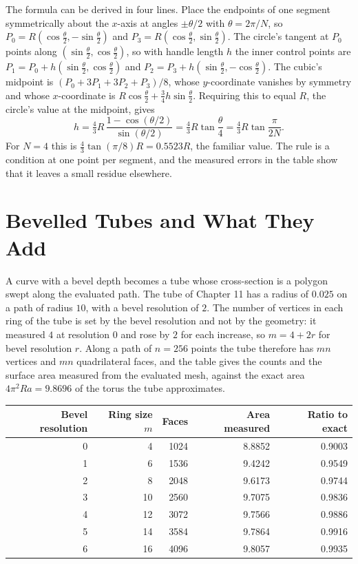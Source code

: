The formula can be derived in four lines. Place the endpoints of one segment symmetrically about the $x$-axis at angles $\pm\theta/2$ with $\theta=2\pi/N$, so $P_0=R(\cos\tfrac\theta2,-\sin\tfrac\theta2)$ and $P_3=R(\cos\tfrac\theta2,\sin\tfrac\theta2)$. The circle's tangent at $P_0$ points along $(\sin\tfrac\theta2,\cos\tfrac\theta2)$, so with handle length $h$ the inner control points are $P_1=P_0+h(\sin\tfrac\theta2,\cos\tfrac\theta2)$ and $P_2=P_3+h(\sin\tfrac\theta2,-\cos\tfrac\theta2)$. The cubic's midpoint is $(P_0+3P_1+3P_2+P_3)/8$, whose $y$-coordinate vanishes by symmetry and whose $x$-coordinate is $R\cos\tfrac\theta2+\tfrac34h\sin\tfrac\theta2$. Requiring this to equal $R$, the circle's value at the midpoint, gives
\[
  h=\tfrac43R\,\frac{1-\cos(\theta/2)}{\sin(\theta/2)}=\tfrac43R\tan\frac\theta4=\tfrac43R\tan\frac{\pi}{2N}.
\]
For $N=4$ this is $\tfrac43\tan(\pi/8)R=0.5523R$, the familiar value. The rule is a condition at one point per segment, and the measured errors in the table show that it leaves a small residue elsewhere.

\section{Bevelled Tubes and What They Add}

A curve with a bevel depth becomes a tube whose cross-section is a polygon swept along the evaluated path. The tube of Chapter 11 has a radius of $0.025$ on a path of radius $10$, with a bevel resolution of $2$. The number of vertices in each ring of the tube is set by the bevel resolution and not by the geometry: it measured $4$ at resolution $0$ and rose by $2$ for each increase, so $m=4+2r$ for bevel resolution $r$. Along a path of $n=256$ points the tube therefore has $mn$ vertices and $mn$ quadrilateral faces, and the table gives the counts and the surface area measured from the evaluated mesh, against the exact area $4\pi^2Ra=9.8696$ of the torus the tube approximates.

\begin{center}
\begin{tabular}{rrrrr}
\toprule
Bevel resolution & Ring size $m$ & Faces & Area measured & Ratio to exact\\
\midrule
0 & 4 & 1024 & 8.8852 & 0.9003\\
1 & 6 & 1536 & 9.4242 & 0.9549\\
2 & 8 & 2048 & 9.6173 & 0.9744\\
3 & 10 & 2560 & 9.7075 & 0.9836\\
4 & 12 & 3072 & 9.7566 & 0.9886\\
5 & 14 & 3584 & 9.7864 & 0.9916\\
6 & 16 & 4096 & 9.8057 & 0.9935\\
\bottomrule
\end{tabular}
\end{center}

